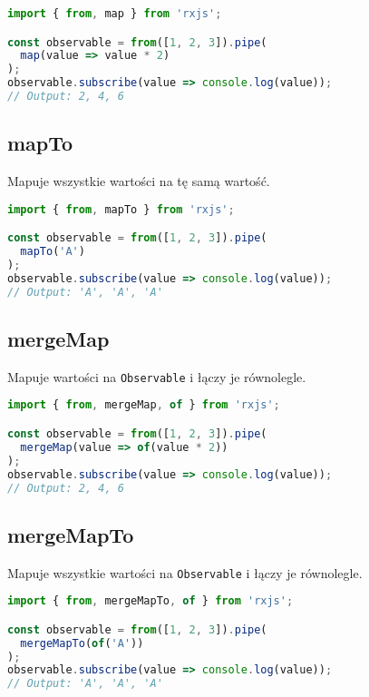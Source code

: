 \documentclass[a4paper,12pt]{article}
\begin{document}
\begin{lstlisting}[language=JavaScript, caption=Przykład użycia \texttt{map}]
import { from, map } from 'rxjs';

const observable = from([1, 2, 3]).pipe(
  map(value => value * 2)
);
observable.subscribe(value => console.log(value));
// Output: 2, 4, 6
\end{lstlisting}

\subsection{mapTo}
Mapuje wszystkie wartości na tę samą wartość.

\begin{lstlisting}[language=JavaScript, caption=Przykład użycia \texttt{mapTo}]
import { from, mapTo } from 'rxjs';

const observable = from([1, 2, 3]).pipe(
  mapTo('A')
);
observable.subscribe(value => console.log(value));
// Output: 'A', 'A', 'A'
\end{lstlisting}

\subsection{mergeMap}
Mapuje wartości na \texttt{Observable} i łączy je równolegle.

\begin{lstlisting}[language=JavaScript, caption=Przykład użycia \texttt{mergeMap}]
import { from, mergeMap, of } from 'rxjs';

const observable = from([1, 2, 3]).pipe(
  mergeMap(value => of(value * 2))
);
observable.subscribe(value => console.log(value));
// Output: 2, 4, 6
\end{lstlisting}

\subsection{mergeMapTo}
Mapuje wszystkie wartości na \texttt{Observable} i łączy je równolegle.

\begin{lstlisting}[language=JavaScript, caption=Przykład użycia \texttt{mergeMapTo}]
import { from, mergeMapTo, of } from 'rxjs';

const observable = from([1, 2, 3]).pipe(
  mergeMapTo(of('A'))
);
observable.subscribe(value => console.log(value));
// Output: 'A', 'A', 'A'
\end{lstlisting}
\end{document}
